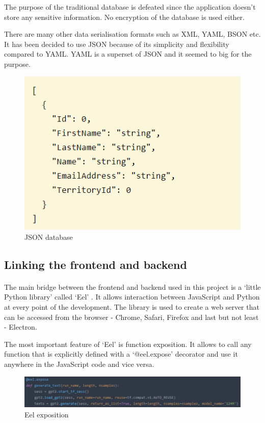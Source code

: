 \documentclass[12pt]{report}
\begin{document}
The purpose of the traditional database is defeated since the application doesn't store any sensitive information.
No encryption of the database is used either.

There are many other data serialisation formats such as XML, YAML, BSON etc. It has been decided to use JSON because
of its simplicity and flexibility compared to YAML. YAML is a superset of JSON and it seemed to big for the purpose.

\begin{figure}[ht]
  \centering
  \includegraphics[width=0.5\linewidth]{img/json_example.png}
  \caption{JSON database}
  \label{fig:json}
\end{figure}

\subsection*{Linking the frontend and backend}
\paragraph{}
The main bridge between the frontend and backend used in this project is a `little Python library' 
called `Eel' \citep{knott_2022_eel}. It allows interaction between JavaScript and Python at every point of
the development. The library is used to create a web server that can be accessed from the browser - 
Chrome, Safari, Firefox and last but not least - Electron. 

The most important feature of `Eel' is function exposition. It allows to call any function that is explicitly 
defined with a `@eel.expose' decorator and use it anywhere in the JavaScript code and vice versa.

\begin{figure}[ht]
  \centering
  \includegraphics[width=1\linewidth]{img/eel_expose_example.png}
  \caption{Eel exposition}
  \label{fig:eel}
\end{figure}
\end{document}
